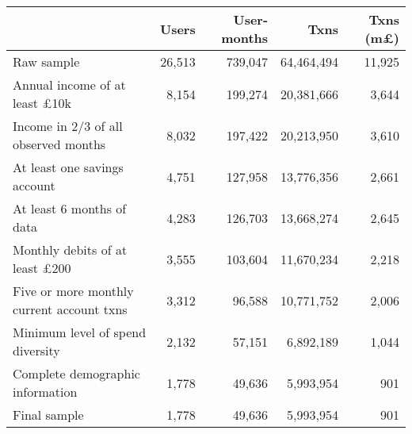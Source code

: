 \begin{tabular}{lrrrr}
\toprule
                                          &  Users & User-months &       Txns & Txns (m\pounds) \\
\midrule
                               Raw sample & 26,513 &     739,047 & 64,464,494 &          11,925 \\
     Annual income of at least \pounds10k &  8,154 &     199,274 & 20,381,666 &           3,644 \\
     Income in 2/3 of all observed months &  8,032 &     197,422 & 20,213,950 &           3,610 \\
             At least one savings account &  4,751 &     127,958 & 13,776,356 &           2,661 \\
                At least 6 months of data &  4,283 &     126,703 & 13,668,274 &           2,645 \\
    Monthly debits of at least \pounds200 &  3,555 &     103,604 & 11,670,234 &           2,218 \\
Five or more monthly current account txns &  3,312 &      96,588 & 10,771,752 &           2,006 \\
         Minimum level of spend diversity &  2,132 &      57,151 &  6,892,189 &           1,044 \\
         Complete demographic information &  1,778 &      49,636 &  5,993,954 &             901 \\
                             Final sample &  1,778 &      49,636 &  5,993,954 &             901 \\
\bottomrule
\end{tabular}

